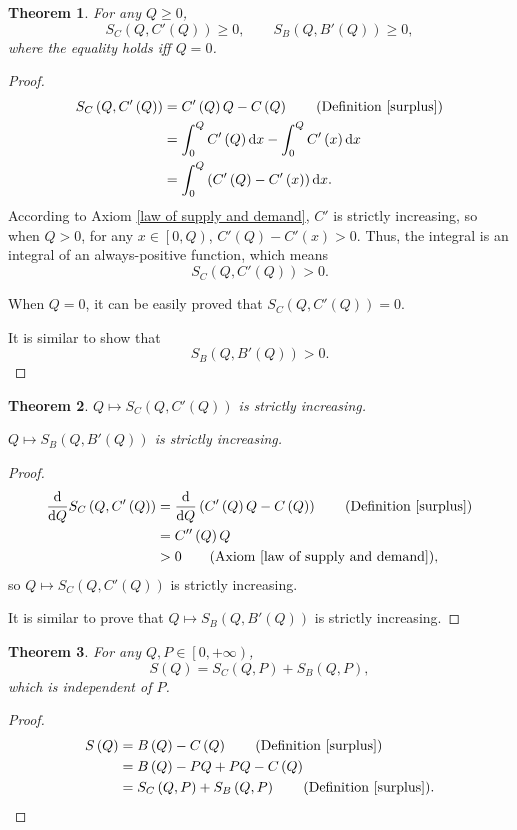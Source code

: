 \documentclass{article}
\newtheorem{theorem}{Theorem}
\begin{document}
\begin{theorem}
For any $Q\ge0$,
$$S_C\left(Q,C'\left(Q\right)\right)\ge0,
\qquad S_B\left(Q,B'\left(Q\right)\right)\ge0,$$
where the equality holds iff $Q=0$.
\end{theorem}
\begin{proof}
\begin{align*}
S_C\left(Q,C'\left(Q\right)\right)&=C'\left(Q\right)Q-C\left(Q\right)\qquad\text{(Definition \ref{surplus})}\\
&=\int_0^QC'\left(Q\right)\mathrm dx-\int_0^QC'\left(x\right)\mathrm dx\\
&=\int_0^Q\left(C'\left(Q\right)-C'\left(x\right)\right)\mathrm dx.
\end{align*}
According to Axiom \ref{law of supply and demand}, $C'$ is strictly increasing,
so when $Q>0$, for any $x\in\left[0,Q\right)$, $C'\left(Q\right)-C'\left(x\right)>0$.
Thus, the integral is an integral of an always-positive function, which means
$$S_C\left(Q,C'\left(Q\right)\right)>0.$$

When $Q=0$, it can be easily proved that $S_C\left(Q,C'\left(Q\right)\right)=0$.

It is similar to show that $$S_B\left(Q,B'\left(Q\right)\right)>0.$$
\end{proof}

\begin{theorem}
$Q\mapsto S_C\left(Q,C'\left(Q\right)\right)$ is strictly increasing.

$Q\mapsto S_B\left(Q,B'\left(Q\right)\right)$ is strictly increasing.
\end{theorem}
\begin{proof}
\begin{align*}
\frac{\mathrm d}{\mathrm dQ}S_C\left(Q,C'\left(Q\right)\right)&=\frac{\mathrm d}{\mathrm dQ}\left(C'\left(Q\right)Q-C\left(Q\right)\right)\qquad\text{(Definition \ref{surplus})}\\
&=C''\left(Q\right)Q\\
&>0\qquad\text{(Axiom \ref{law of supply and demand})},
\end{align*}
so $Q\mapsto S_C\left(Q,C'\left(Q\right)\right)$ is strictly increasing.

It is similar to prove that $Q\mapsto S_B\left(Q,B'\left(Q\right)\right)$ is strictly increasing.
\end{proof}

\begin{theorem}
For any $Q,P\in\left[0,+\infty\right)$,
$$S\left(Q\right)=S_C\left(Q,P\right)+S_B\left(Q,P\right),$$
which is independent of $P$.
\end{theorem}
\begin{proof}
\begin{align*}
S\left(Q\right)&=B\left(Q\right)-C\left(Q\right)\qquad\text{(Definition \ref{surplus})}\\
&=B\left(Q\right)-PQ+PQ-C\left(Q\right)\\
&=S_C\left(Q,P\right)+S_B\left(Q,P\right)\qquad\text{(Definition \ref{surplus})}.
\end{align*}
\end{proof}
\end{document}

